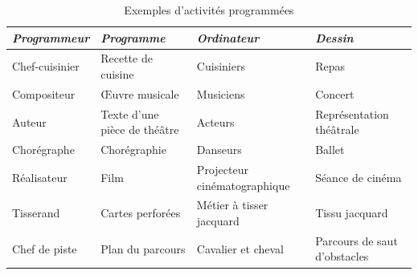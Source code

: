 \begin{table}[htbp]
\begin{center}
\small
\begin{tabular}{@{}|p{25mm}|p{30mm}|p{30mm}|p{30mm}|@{}}
\hline
{\em Programmeur } & {\em Programme } & {\em Ordinateur } & {\em Dessin }  \\ 
\hline \hline
Chef-cui\-si\-nier & Re\-cet\-te de cui\-si\-ne & Cui\-si\-niers & Re\-pas\\
Com\-po\-si\-teur & Œu\-vre mu\-si\-ca\-le & Mu\-si\-ciens & Con\-cert \\
Au\-teur & Tex\-te d'une piè\-ce de thé\-â\-tre  & Ac\-teurs & Re\-pré\-sen\-ta\-tion \hfill thé\-â\-tra\-le \\
Cho\-ré\-gra\-phe & Cho\-ré\-gra\-phie & Dan\-seurs & Bal\-let \\
Réa\-li\-sa\-teur & Film & Pro\-jec\-teur \hfill ci\-né\-ma\-to\-gra\-phi\-que & Sé\-an\-ce de ci\-né\-ma \\
Tis\-se\-rand & Car\-tes per\-fo\-rées & Mé\-tier \hfill à \hfill tis\-ser jac\-quard & Tis\-su jac\-quard\\
Chef de pis\-te & Plan du par\-cours & Ca\-va\-lier et che\-val & Par\-cours de saut d'obs\-ta\-cles \\
\hline
\end{tabular}
\end{center}
\caption{Exemples d'activités programmées}
\end{table}

